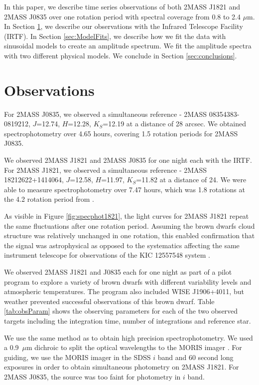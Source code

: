\documentclass[twocolumn]{aastex6}
\begin{document}
In this paper, we describe time series observations of both 2MASS J1821 and 2MASS J0835 over one rotation period with spectral coverage from 0.8 to 2.4 $\mu$m.
In Section \ref{sec:obs}, we describe our observations with the Infrared Telescope Facility (IRTF).
In Section \ref{sec:ModelFits}, we describe how we fit the data with sinusoidal models to create an amplitude spectrum.
We fit the amplitude spectra with two different physical models.
We conclude in Section \ref{sec:conclusions}.


\section{Observations}\label{sec:obs}

For 2MASS J0835, we observed a simultaneous reference - 2MASS 08354383-0819212, $J$=12.74, $H$=12.28, $K_S$=12.19 at a distance of 28 arcsec.
We obtained spectrophotometry over 4.65 hours, covering 1.5 rotation periods for 2MASS J0835.

We observed 2MASS J1821 and 2MASS J0835 for one night each with the IRTF.
For 2MASS J1821, we observed a simultaneous reference - 2MASS 18212622+1414064, $J$=12.58, $H$=11.97, $K_S$=11.82  at a distance of 24\arcsec.
We were able to measure spectrophotometry over 7.47 hours, which was 1.8 rotations at the 4.2 rotation period from \citet{metchev2015weatherII}.

As visible in Figure \ref{fig:specphot1821}, the light curves for 2MASS J1821 repeat the same fluctuations after one rotation period.
Assuming the brown dwarfs cloud structure was relatively unchanged in one rotation, this enabled confirmation that the signal was astrophysical as opposed to the systematics affecting the same instrument telescope for observations of the  KIC 12557548 system \citep{schlawin2016kic1255}.

We observed 2MASS J1821 and J0835 each for one night as part of a pilot program to explore a variety of brown dwarfs with different variability levels and atmospheric temperatures.
The program also included WISE J1906+4011, but weather prevented successful observations of this brown dwarf.
Table \ref{tab:obsParam} shows the observing parameters for each of the two observed targets including the integration time, number of integrations and reference star.

We use the same method as \citet{schlawin2014} to obtain high precision spectrophotometry.
We used a 0.9~$\mu$m dichroic to split the optical wavelengths to the MORIS imager \citep{Gulbis2011}.
For guiding, we use the MORIS imager in the SDSS $i$ band and 60 second long exposures in order to obtain simultaneous photometry on 2MASS J1821.
For 2MASS J0835, the source was too faint for photometry in $i$ band.
\end{document}
